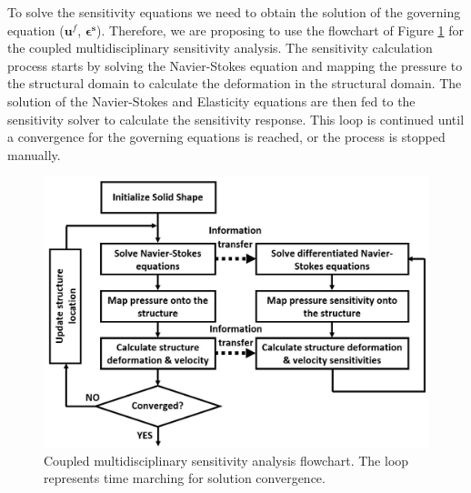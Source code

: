 To solve the sensitivity equations we need to obtain the solution of the governing equation ($\mathbf{u}^f$, $\mathbf{\epsilon^s}$). Therefore, we are proposing to use the flowchart of Figure \ref{fig:C5_SAflowchart} for the coupled multidisciplinary sensitivity analysis. The sensitivity calculation process starts by solving the Navier-Stokes equation and mapping the pressure to the structural domain to calculate the deformation in the structural domain. The solution of the Navier-Stokes and Elasticity equations are then fed to the sensitivity solver to calculate the sensitivity response. This loop is continued until a convergence for the governing equations is reached, or the process is stopped manually. 
%
\begin{figure}[H]
    \centering
    \includegraphics[width=14.00cm]{Chapter_5/figure/couple_SA_flowchart.jpg}
    \caption{Coupled multidisciplinary sensitivity analysis flowchart. The loop represents time marching for solution convergence.}
    \label{fig:C5_SAflowchart}
\end{figure}
%